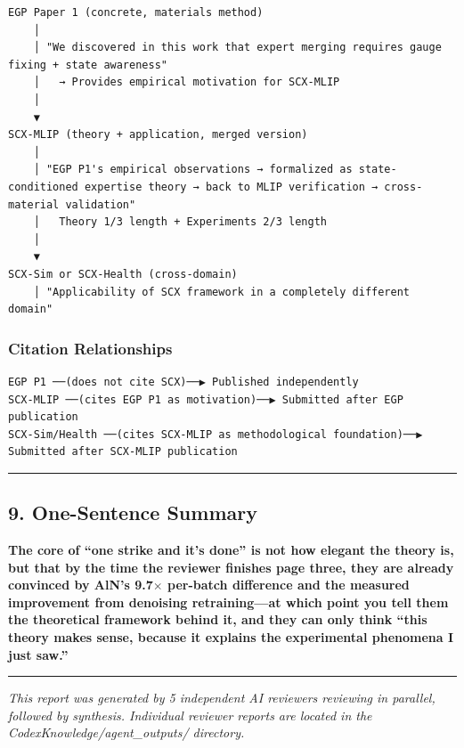 \documentclass[
  12pt,
]{article}
\begin{document}
\begin{verbatim}
EGP Paper 1 (concrete, materials method)
    │
    │ "We discovered in this work that expert merging requires gauge fixing + state awareness"
    │   → Provides empirical motivation for SCX-MLIP
    │
    ▼
SCX-MLIP (theory + application, merged version)
    │
    │ "EGP P1's empirical observations → formalized as state-conditioned expertise theory → back to MLIP verification → cross-material validation"
    │   Theory 1/3 length + Experiments 2/3 length
    │
    ▼
SCX-Sim or SCX-Health (cross-domain)
    │ "Applicability of SCX framework in a completely different domain"
\end{verbatim}

\subsubsection{Citation Relationships}\label{citation-relationships}

\begin{verbatim}
EGP P1 ──(does not cite SCX)──▶ Published independently
SCX-MLIP ──(cites EGP P1 as motivation)──▶ Submitted after EGP publication
SCX-Sim/Health ──(cites SCX-MLIP as methodological foundation)──▶ Submitted after SCX-MLIP publication
\end{verbatim}

\begin{center}\rule{0.5\linewidth}{0.5pt}\end{center}

\subsection{9. One-Sentence Summary}\label{one-sentence-summary}

\textbf{The core of ``one strike and it's done'' is not how elegant the theory is, but that by the time the reviewer finishes page three, they are already convinced by AlN's 9.7$\times$ per-batch difference and the measured improvement from denoising retraining---at which point you tell them the theoretical framework behind it, and they can only think ``this theory makes sense, because it explains the experimental phenomena I just saw.''}

\begin{center}\rule{0.5\linewidth}{0.5pt}\end{center}

\emph{This report was generated by 5 independent AI reviewers reviewing in parallel, followed by synthesis. Individual reviewer reports are located in the CodexKnowledge/agent\_outputs/ directory.}
\end{document}
